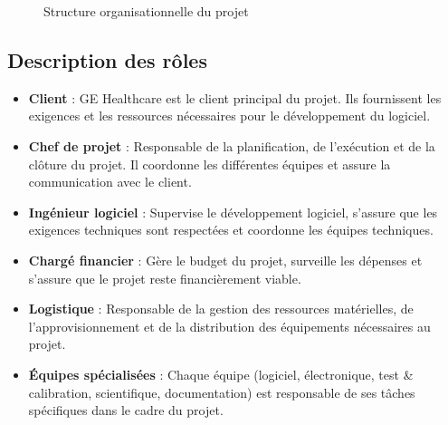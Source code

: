 \documentclass[11pt]{article}
\begin{document}
\begin{figure}[h!]
  \centering
  \caption{Structure organisationnelle du projet}
\end{figure}

\subsection{Description des rôles}

\begin{itemize}
  \item \textbf{Client} : GE Healthcare est le client principal du projet. Ils fournissent les exigences et les ressources nécessaires pour le développement du logiciel.
  \item \textbf{Chef de projet} : Responsable de la planification, de l'exécution et de la clôture du projet. Il coordonne les différentes équipes et assure la communication avec le client.
  \item \textbf{Ingénieur logiciel} : Supervise le développement logiciel, s'assure que les exigences techniques sont respectées et coordonne les équipes techniques.
  \item \textbf{Chargé financier} : Gère le budget du projet, surveille les dépenses et s'assure que le projet reste financièrement viable.
  \item \textbf{Logistique} : Responsable de la gestion des ressources matérielles, de l'approvisionnement et de la distribution des équipements nécessaires au projet.
  \item \textbf{Équipes spécialisées} : Chaque équipe (logiciel, électronique, test \& calibration, scientifique, documentation) est responsable de ses tâches spécifiques dans le cadre du projet.
\end{itemize}
\end{document}
